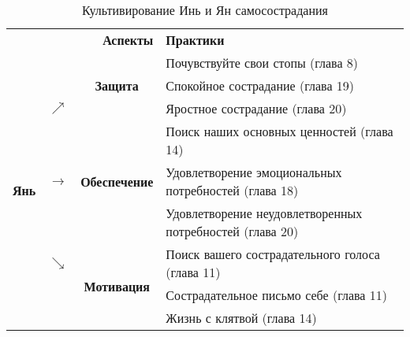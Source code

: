 \begin{table}[!h]
	\begin{center}
		\setlength{\extrarowheight}{1mm}
		\begin{tabular}{ccc||l}
			\multicolumn{3}{r||}{{\large\textbf{Аспекты}}} &{\large\textbf{Практики}}\\
			\cline{3-4}
			\multirow{9}{*}{{\huge\textbf{Янь}}} &  & \multirow{3}{*}{\textbf{Защита}} & Почувствуйте свои стопы (глава 8) \\ 
			&  &  & Спокойное сострадание (глава 19)\\ 
			& $\nearrow$ &  & Яростное сострадание (глава 20)\\ \cline{3-4}
			& \multirow{3}{*}{\textbf{$\rightarrow$}} & \multirow{3}{*}{\textbf{Обеспечение}} & Поиск наших основных ценностей (глава 14)\\
			&   &   & Удовлетворение эмоциональных потребностей (глава 18)\\
			&   &   & Удовлетворение неудовлетворенных потребностей (глава 20)\\ \cline{3-4}
			& $\searrow$ & \multirow{3}{*}{\textbf{Мотивация}} & Поиск вашего сострадательного голоса (глава 11)\\
			&   &   & Сострадательное письмо себе (глава 11)\\
			&   &   & Жизнь с клятвой (глава 14)\\ \cline{3-4}
		\end{tabular}
		\setlength{\extrarowheight}{0mm}
		\caption{Культивирование Инь и Ян самосострадания}\label{tab:Yin_and_Yang}
	\end{center}
\end{table} 

